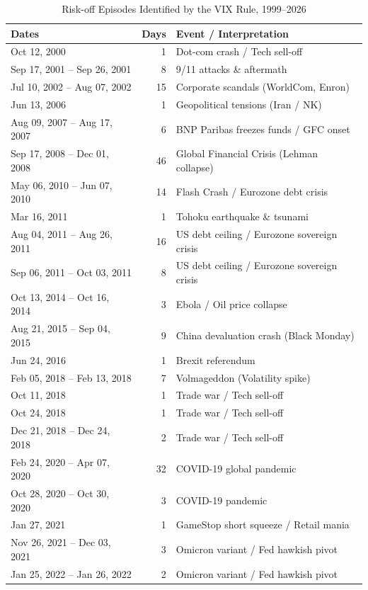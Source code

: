 \FloatBarrier
\begin{table}[H]
  \centering
  \caption{Risk-off Episodes Identified by the VIX Rule, 1999--2026}
  \label{tab:episodes}
  \small
  \begin{tabular}{l r l}
    \toprule
    Dates & Days & Event / Interpretation \\
    \midrule
Oct 12, 2000 & 1 & Dot-com crash / Tech sell-off \\
Sep 17, 2001 -- Sep 26, 2001 & 8 & 9/11 attacks \& aftermath \\
Jul 10, 2002 -- Aug 07, 2002 & 15 & Corporate scandals (WorldCom, Enron) \\
Jun 13, 2006 & 1 & Geopolitical tensions (Iran / NK) \\
Aug 09, 2007 -- Aug 17, 2007 & 6 & BNP Paribas freezes funds / GFC onset \\
Sep 17, 2008 -- Dec 01, 2008 & 46 & Global Financial Crisis (Lehman collapse) \\
May 06, 2010 -- Jun 07, 2010 & 14 & Flash Crash / Eurozone debt crisis \\
Mar 16, 2011 & 1 & Tohoku earthquake \& tsunami \\
Aug 04, 2011 -- Aug 26, 2011 & 16 & US debt ceiling / Eurozone sovereign crisis \\
Sep 06, 2011 -- Oct 03, 2011 & 8 & US debt ceiling / Eurozone sovereign crisis \\
Oct 13, 2014 -- Oct 16, 2014 & 3 & Ebola / Oil price collapse \\
Aug 21, 2015 -- Sep 04, 2015 & 9 & China devaluation crash (Black Monday) \\
Jun 24, 2016 & 1 & Brexit referendum \\
Feb 05, 2018 -- Feb 13, 2018 & 7 & Volmageddon (Volatility spike) \\
Oct 11, 2018 & 1 & Trade war / Tech sell-off \\
Oct 24, 2018 & 1 & Trade war / Tech sell-off \\
Dec 21, 2018 -- Dec 24, 2018 & 2 & Trade war / Tech sell-off \\
Feb 24, 2020 -- Apr 07, 2020 & 32 & COVID-19 global pandemic \\
Oct 28, 2020 -- Oct 30, 2020 & 3 & COVID-19 pandemic \\
Jan 27, 2021 & 1 & GameStop short squeeze / Retail mania \\
Nov 26, 2021 -- Dec 03, 2021 & 3 & Omicron variant / Fed hawkish pivot \\
Jan 25, 2022 -- Jan 26, 2022 & 2 & Omicron variant / Fed hawkish pivot \\

\end{tabular}
\end{table}

